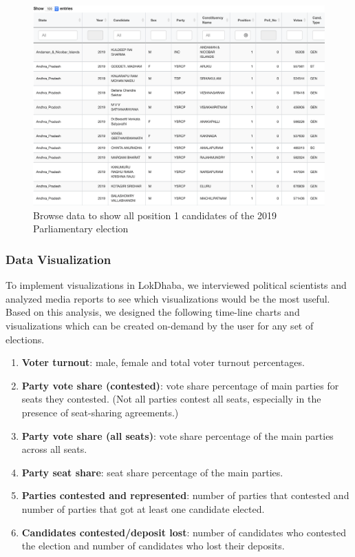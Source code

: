  \begin{figure}
 \centering
 \includegraphics[width=\linewidth]{BrowseLS17Winners}
 \caption{Browse data to show all position 1 candidates of the 2019 Parliamentary election}
 \label{browse}
 \end{figure}
 
 \subsubsection{Data Visualization}
  To implement visualizations in LokDhaba, we interviewed political scientists and analyzed media reports to see which visualizations would be the most useful. Based on this analysis, we designed the following time-line charts and visualizations which can be created on-demand by the user for any set of elections.

\begin{enumerate}
    \item \textbf{Voter turnout}: male, female and total voter turnout percentages.
    \item \textbf{Party vote share (contested)}: vote share percentage of main parties for seats they contested. (Not all parties contest all seats, especially in the presence of seat-sharing agreements.)
    \item \textbf{Party vote share (all seats)}: vote share percentage of the main parties across all seats.
    \item \textbf{Party seat share}: seat share percentage of the main parties.
    \item \textbf{Parties contested and represented}: number of parties that contested and number of parties that got at least one candidate elected.
    \item \textbf{Candidates contested/deposit lost}: number of candidates who contested the election and number of candidates who lost their deposits.
\end{enumerate}


